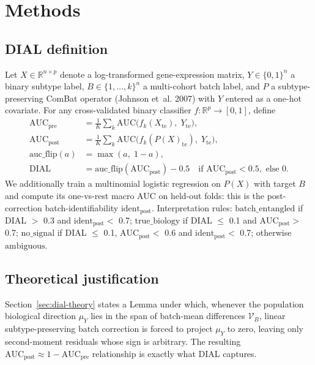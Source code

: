 \documentclass[11pt]{article}
\begin{document}
\section{Methods}

\subsection{DIAL definition}

Let $X \in \mathbb{R}^{n \times p}$ denote a log-transformed gene-expression matrix, $Y \in \{0,1\}^n$ a binary subtype label, $B \in \{1,\dots,k\}^n$ a multi-cohort batch label, and $P$ a subtype-preserving ComBat operator (Johnson et~al. 2007) with $Y$ entered as a one-hot covariate. For any cross-validated binary classifier $f : \mathbb{R}^p \to [0,1]$, define
\begin{align*}
\mathrm{AUC}_{\mathrm{pre}}  &= \tfrac{1}{K}\textstyle\sum_{k} \mathrm{AUC}\bigl(f_k(X_{\mathrm{te}}),\; Y_{\mathrm{te}}\bigr),\\
\mathrm{AUC}_{\mathrm{post}} &= \tfrac{1}{K}\textstyle\sum_{k} \mathrm{AUC}\bigl(f_k(P(X)_{\mathrm{te}}),\; Y_{\mathrm{te}}\bigr),\\
\mathrm{auc\_flip}(a) &= \max(a,\; 1-a),\\
\mathrm{DIAL} &= \mathrm{auc\_flip}(\mathrm{AUC}_{\mathrm{post}}) - 0.5 \quad \text{if } \mathrm{AUC}_{\mathrm{post}} < 0.5, \text{ else } 0.
\end{align*}
We additionally train a multinomial logistic regression on $P(X)$ with target $B$ and compute its one-vs-rest macro AUC on held-out folds: this is the post-correction batch-identifiability $\mathrm{ident}_{\mathrm{post}}$. Interpretation rules: $\mathrm{batch\_entangled}$ if DIAL $>$ 0.3 and $\mathrm{ident}_{\mathrm{post}} <$ 0.7; $\mathrm{true\_biology}$ if DIAL $\le$ 0.1 and $\mathrm{AUC}_{\mathrm{post}} >$ 0.7; $\mathrm{no\_signal}$ if DIAL $\le$ 0.1, $\mathrm{AUC}_{\mathrm{post}} <$ 0.6 and $\mathrm{ident}_{\mathrm{post}} <$ 0.7; otherwise $\mathrm{ambiguous}$.

\subsection{Theoretical justification}

Section~\ref{sec:dial-theory} states a Lemma under which, whenever the population biological direction $\mu_Y$ lies in the span of batch-mean differences $\mathcal{V}_B$, linear subtype-preserving batch correction is forced to project $\mu_Y$ to zero, leaving only second-moment residuals whose sign is arbitrary. The resulting $\mathrm{AUC}_{\mathrm{post}} \approx 1 - \mathrm{AUC}_{\mathrm{pre}}$ relationship is exactly what DIAL captures.
\end{document}
